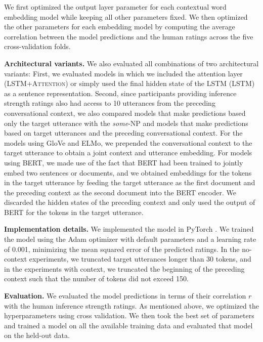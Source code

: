 \documentclass[11pt,a4paper]{article}
\newcommand{\figref}[1]{Figure~\ref{#1}}
\begin{document}
We first optimized the output layer parameter for each contextual word embedding model while keeping all other parameters fixed. We then optimized the other parameters for each embedding model by computing the average correlation between the model predictions and the human ratings across the five cross-validation folds. 



\noindent \textbf{Architectural variants.} We also evaluated all combinations of two architectural variants: First, we evaluated models in which we included the attention layer (\textsc{LSTM+Attention}) or simply used the final hidden state of the LSTM (\textsc{LSTM}) as a sentence representation. Second, since participants providing inference strength ratings also had access to 10 utterances from the  preceding conversational context, we also compared models that make predictions based only the target utterance with the \emph{some}-NP and models that make predictions based on target utterances and the preceding conversational context. 
For the models using GloVe and ELMo, we prepended the conversational context to the target utterance to obtain a joint context and utterance embedding. For models using BERT, we made use of the fact that BERT had been trained to jointly embed two sentences or documents, and we obtained embeddings for the tokens in the target utterance by feeding the target utterance as the first document and the preceding context as the second document into the BERT encoder. %
We discarded the hidden states of the preceding context and only used the output of BERT for the tokens in the target utterance.




\noindent \textbf{Implementation details.} We implemented the model in PyTorch \cite{paszke2017automatic}. We trained the model using the Adam optimizer \cite{kingma2014adam} with default parameters and a learning rate of 0.001, minimizing the mean squared error of the predicted ratings. 
In the no-context experiments, we truncated target utterances longer than 30 tokens, and in the experiments with context, we truncated the beginning of the preceding context such that the number of tokens did not exceed 150.



\noindent \textbf{Evaluation.} We evaluated the model predictions in terms of their correlation $r$ with the human inference strength ratings.
As mentioned above, we optimized the hyperparameters using cross validation. We then took 
the best set of parameters and trained a model on all the available training data and evaluated that model on the held-out data.
\end{document}
